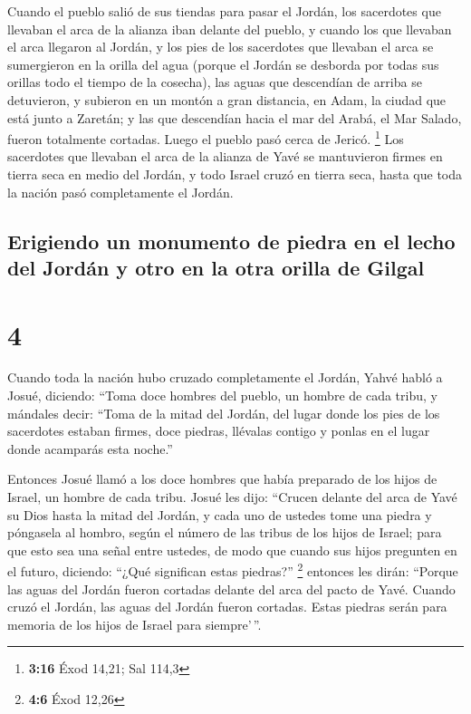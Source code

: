  Cuando el pueblo salió de sus tiendas para pasar el
Jordán, los sacerdotes que llevaban el arca de la alianza iban delante
del pueblo,  y cuando los que llevaban el arca llegaron
al Jordán, y los pies de los sacerdotes que llevaban el arca se
sumergieron en la orilla del agua (porque el Jordán se desborda por
todas sus orillas todo el tiempo de la cosecha),  las
aguas que descendían de arriba se detuvieron, y subieron en un montón a
gran distancia, en Adam, la ciudad que está junto a Zaretán; y las que
descendían hacia el mar del Arabá, el Mar Salado, fueron totalmente
cortadas. Luego el pueblo pasó cerca de Jericó. \footnote{\textbf{3:16}
  Éxod 14,21; Sal 114,3}  Los sacerdotes que llevaban el
arca de la alianza de Yavé se mantuvieron firmes en tierra seca en medio
del Jordán, y todo Israel cruzó en tierra seca, hasta que toda la nación
pasó completamente el Jordán.

\hypertarget{erigiendo-un-monumento-de-piedra-en-el-lecho-del-jorduxe1n-y-otro-en-la-otra-orilla-de-gilgal}{%
\subsection{Erigiendo un monumento de piedra en el lecho del Jordán y
otro en la otra orilla de
Gilgal}\label{erigiendo-un-monumento-de-piedra-en-el-lecho-del-jorduxe1n-y-otro-en-la-otra-orilla-de-gilgal}}

\hypertarget{section-3}{%
\section{4}\label{section-3}}

 Cuando toda la nación hubo cruzado completamente el
Jordán, Yahvé habló a Josué, diciendo:  ``Toma doce
hombres del pueblo, un hombre de cada tribu,  y mándales
decir: ``Toma de la mitad del Jordán, del lugar donde los pies de los
sacerdotes estaban firmes, doce piedras, llévalas contigo y ponlas en el
lugar donde acamparás esta noche.''

 Entonces Josué llamó a los doce hombres que había
preparado de los hijos de Israel, un hombre de cada tribu.
 Josué les dijo: ``Crucen delante del arca de Yavé su Dios
hasta la mitad del Jordán, y cada uno de ustedes tome una piedra y
póngasela al hombro, según el número de las tribus de los hijos de
Israel;  para que esto sea una señal entre ustedes, de
modo que cuando sus hijos pregunten en el futuro, diciendo: ``¿Qué
significan estas piedras?'' \footnote{\textbf{4:6} Éxod 12,26}
 entonces les dirán: ``Porque las aguas del Jordán fueron
cortadas delante del arca del pacto de Yavé. Cuando cruzó el Jordán, las
aguas del Jordán fueron cortadas. Estas piedras serán para memoria de
los hijos de Israel para siempre'\,''.

